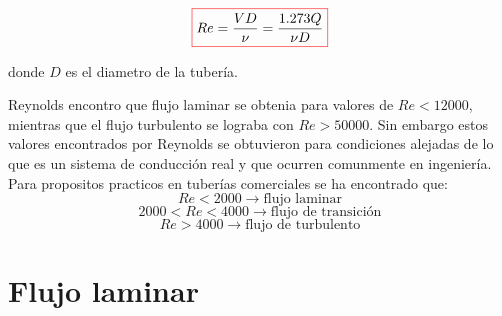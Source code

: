 \documentclass[10pt, oneside]{article}
\begin{document}
\begin{equation}
\color{red}\boxed{\color{black} Re = \frac{VD}{\nu} = \frac{1.273Q}{\nu D} }
\label{rey}
\end{equation}

donde $D$ es el diametro de la tuber\'ia. 

Reynolds encontro que flujo laminar se obtenia para valores de $Re<12000$, mientras que el flujo turbulento se lograba con $Re>50000$. Sin embargo estos valores encontrados por Reynolds se obtuvieron para condiciones alejadas de lo que es un sistema de conducci\'on real y que ocurren comunmente en ingenier\'ia. Para propositos practicos en tuber\'ias comerciales se ha encontrado que:
$$
Re < 2000 \rightarrow \text{flujo laminar}
$$
$$
2000 < Re < 4000 \rightarrow \text{flujo de transici\'on}
$$
$$
Re > 4000 \rightarrow \text{flujo de turbulento}
$$ 

\section{Flujo laminar}


\end{document}
